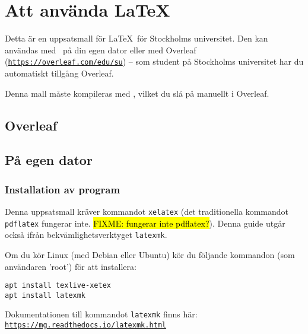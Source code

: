 
\section{Att använda {\rmfamily\LaTeX}}
\label{latex}

Detta är en uppsatsmall för \LaTeX\ för Stockholms universitet. Den kan
användas med \XeLaTeX\ på din egen dator eller med Overleaf
(\texttt{\href{https://overleaf.com/edu/su}{https://\linebreak[0]{}overleaf\linebreak[0]{}.com/\linebreak[0]{}edu/\linebreak[0]{}su}})
-- som student på Stockholms universitet har du automatiskt tillgång Overleaf.

Denna mall måste kompileras med \XeLaTeX, vilket du slå på manuellt i Overleaf.

\subsection{Overleaf}


\subsection{På egen dator}

\subsubsection{Installation av program}

Denna uppsatsmall kräver kommandot \texttt{xelatex} (det traditionella
kommandot \texttt{pdflatex} fungerar inte. \hl{FIXME: fungerar inte
pdflatex?}). Denna guide utgår också ifrån bekvämlighetsverktyget
\texttt{latexmk}.

\noindent Om du kör Linux (med Debian eller Ubuntu) kör du följande kommandon (som
användaren 'root') för att installera:

\begin{verbatim}
apt install texlive-xetex
apt install latexmk
\end{verbatim}

\noindent Dokumentationen till kommandot \texttt{latexmk} finns här:
\texttt{\href{https://mg.readthedocs.io/latexmk.html}{https://\linebreak[0]{}mg\linebreak[0]{}.readthedocs\linebreak[0]{}.io/\linebreak[0]{}latexmk\linebreak[0]{}.html}}


